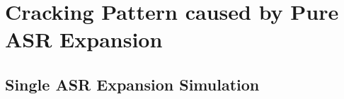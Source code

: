 
\section{Cracking Pattern caused by Pure ASR Expansion}

\subsection{Single ASR Expansion Simulation} 


